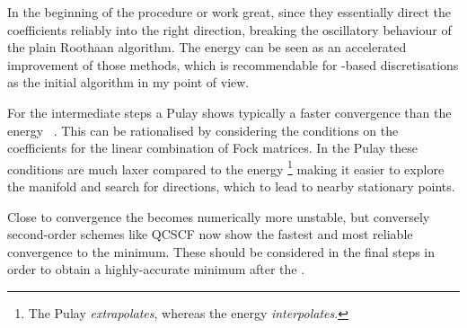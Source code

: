 In the beginning of the procedure \ODA or \tODA work great,
since they essentially direct the coefficients reliably into the right direction,
breaking the oscillatory behaviour of the plain Roothaan algorithm.
The energy \DIIS can be seen as an accelerated improvement of those methods,
which is recommendable for \cGTO-based discretisations
as the initial \SCF algorithm in my point of view.

For the intermediate steps a Pulay \DIIS shows typically a faster
convergence than the energy \DIIS~\cite{Kudin2002}.
This can be rationalised by considering the conditions
on the coefficients for the linear combination of Fock matrices.
In the Pulay \DIIS these conditions are much laxer
compared to the energy \DIIS%
\footnote{The Pulay \DIIS \emph{extrapolates},
whereas the energy \DIIS \emph{interpolates}.}
making it easier to explore the \SCF manifold
and search for directions,
which to lead to nearby stationary points.

Close to convergence the \DIIS becomes numerically more unstable,
but conversely
second-order \SCF schemes like QCSCF now show the fastest and most reliable
convergence to the \SCF minimum.
These should be considered in the final \SCF steps in order to obtain
a highly-accurate \SCF minimum after the \DIIS.
